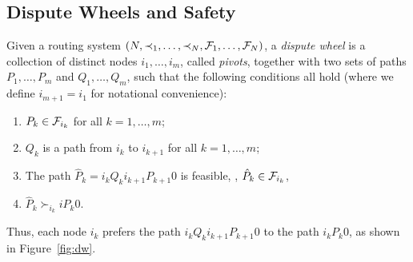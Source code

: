 \subsection{Dispute Wheels and Safety}


\begin{defn}
\label{def:dw}
Given a routing system $(N, \prec_1,\ldots, \prec_N, \mathcal{F}_1, \ldots,
\mathcal{F}_N)$, a {\em dispute wheel} is a collection of distinct nodes
$i_1, \ldots, i_m$, called {\em pivots}, together with two sets of
paths $P_1, \ldots, P_m$ and $Q_1, \ldots, Q_m$, such that the
following conditions all hold (where we define $i_{m+1} = i_1$ for
notational convenience):
\begin{enumerate}
\itemsep=-1pt
\item $P_{k} \in \mathcal{F}_{i_k}$ for all $k = 1,\ldots,m$;
\item $Q_{k}$ is a path from $i_k$ to $i_{k+1}$ for all $k =
1,\ldots,m$;
\item The path $\hat{P}_{k} = i_k Q_{k} i_{k+1} P_{k+1} 0$ is
feasible, \ie, $\hat{P}_{k} \in \mathcal{F}_{i_k}$,
\item $\hat{P}_{k} \succ_{i_k} i P_{k} 0$.
\end{enumerate}
\end{defn}
Thus, each node $i_k$ prefers the path $i_k Q_{k}i_{k+1}
P_{k+1} 0$ to the path $i_k P_{k} 0$, as shown in Figure~\ref{fig:dw}.




